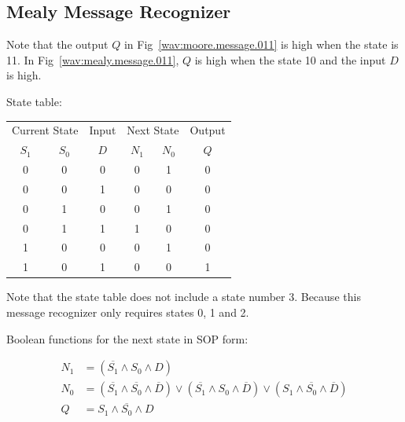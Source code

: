 \documentclass[10pt,letterpaper]{article}
\begin{document}
\subsection{Mealy Message Recognizer}

Note that the output $Q$ in Fig~\ref{wav:moore.message.011} is high when the state is 11. 
In Fig~\ref{wav:mealy.message.011}, $Q$ is high when the state 10 and the input $D$ is high.

State table:

\begin{center}
\begin{tabular}{|cc|c||cc|c|}
\hline
\multicolumn{2}{|c|}{Current State} & Input & \multicolumn{2}{|c|}{Next State} & Output \\
$S_1$ & $S_0$ & $D$ & $N_1$ & $N_0$ & $Q$ \\
\hline
\hline
0 & 0 &  0  & 0 & 1 &  0\\
0 & 0 &  1  & 0 & 0 &  0\\
0 & 1 &  0  & 0 & 1 &  0\\
0 & 1 &  1  & 1 & 0 &  0\\
1 & 0 &  0  & 0 & 1 &  0\\
1 & 0 &  1  & 0 & 0 &  1\\
\hline
\end{tabular}
\end{center}

Note that the state table does not include a state number 3.  
Because this message recognizer only requires states 0, 1 and 2.

Boolean functions for the next state in SOP form:

\begin{align}
N_1	& = (\overline{S_1} \land S_0 \land D)\\
N_0	& = (\overline{S_1} \land \overline{S_0} \land \overline{D}) \lor
		(\overline{S_1} \land S_0 \land \overline{D}) \lor
		(S_1 \land \overline{S_0} \land \overline{D})\\
Q &= S_1 \land \overline{S_0} \land D
\end{align}
\end{document}

